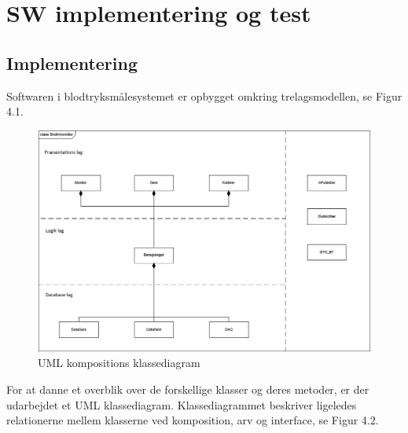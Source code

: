 \chapter{SW implementering og test }

\section{Implementering}
Softwaren i blodtryksmålesystemet er opbygget omkring trelagsmodellen, se Figur 4.1.

\begin{figure}[H]
	\centering
	\includegraphics[width=1\textwidth]{Figurer/3lagsmodel_software}
	\caption{UML kompositions klassediagram}
\end{figure}

For at danne et overblik over de forskellige klasser og deres metoder, er der udarbejdet et UML klassediagram. Klassediagrammet beskriver ligeledes relationerne mellem klasserne ved komposition, arv og interface, se Figur 4.2. 

